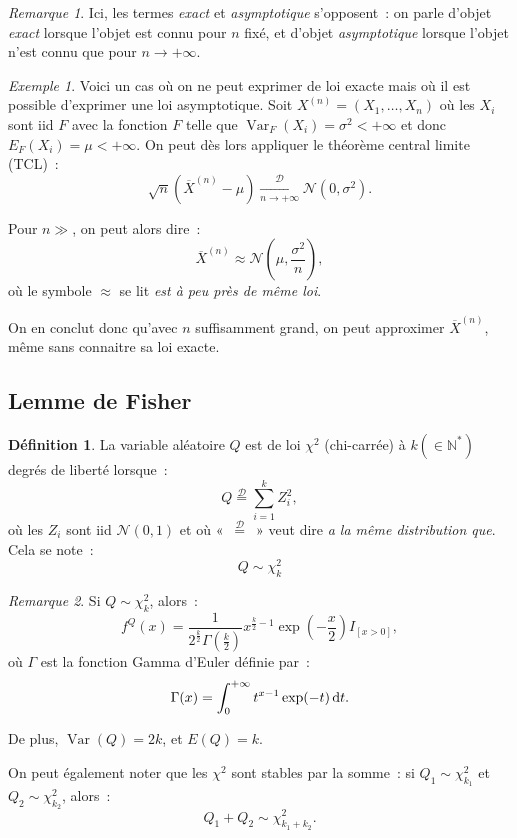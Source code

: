 \documentclass{report}
\DeclareMathOperator{\Var}{Var}
\newcommand{\pinfty}{{+\infty}}
\newcommand{\cvgd}{\xrightarrow[n \to \pinfty]{\mathcal D}}
\newcommand{\distreq}{\overset {\mathcal D}=}
\newcommand{\Nzo}{\mathcal N(0, 1)}
\newcommand{\N}{\mathbb N}
\newcommand{\charfun}[1]{I_{\left[#1\right]}}
\theoremstyle{definition}
\newtheorem{déf}[thm]{Définition}
\theoremstyle{remark}
\newtheorem*{rmq}{Remarque}
\newtheorem{ex}{Exemple}[chapter]
\begin{document}
		\begin{rmq} Ici, les termes \textit{exact} et \textit{asymptotique} s'opposent~: on parle d'objet \textit{exact} lorsque l'objet est connu pour $n$ fixé,
		et d'objet \textit{asymptotique} lorsque l'objet n'est connu que pour $n \to \pinfty$.
		\end{rmq}

		\begin{ex} Voici un cas où on ne peut exprimer de loi exacte mais où il est possible d'exprimer une loi asymptotique. Soit $X^{(n)} = (X_1, \ldots, X_n)$
		où les $X_i$ sont iid $F$ avec la fonction $F$ telle que $\Var_F(X_i) = \sigma^2 < \pinfty$ et donc $E_F(X_i) = \mu < \pinfty$. On peut dès lors
		appliquer le théorème central limite (TCL)~:
		\[\sqrt n(\overline X^{(n)} - \mu) \cvgd \mathcal N(0, \sigma^2).\]

		Pour $n \gg$, on peut alors dire~:
		\[\overline X^{(n)} \approx \mathcal N\left(\mu, \frac {\sigma^2}n\right),\]
		où le symbole $\approx$ se lit \textit{est à peu près de même loi}.

		On en conclut donc qu'avec $n$ suffisamment grand, on peut approximer $\overline X^{(n)}$, même sans connaitre sa loi exacte.
		\end{ex}

	\subsection{Lemme de Fisher}
		\begin{déf} La variable aléatoire $Q$ est de loi $\chi^2$ (chi-carrée) à $k (\in \N^*)$ degrés de liberté lorsque~:
		\[Q \distreq \sum_{i=1}^kZ_i^2,\]
		où les $Z_i$ sont iid $\Nzo$ et où «~$\distreq$~» veut dire \textit{a la même distribution que}. Cela se note~:
		\[Q \sim \chi^2_k\]
		\end{déf}
		\begin{rmq} Si $Q \sim \chi^2_k$, alors~:
		\[f^Q(x) = \frac 1{2^{\frac k2}\Gamma\left(\frac k2\right)}x^{\frac k2-1}\exp\left(-\frac x2\right)\charfun{x > 0},\]
		où $\Gamma$ est la fonction Gamma d'Euler définie par~:
		\[\Gamma(x) = \int_0^\pinfty t^{x-1}\exp(-t)\dif t.\]

		De plus, $\Var(Q) = 2k$, et $E(Q) = k$.

		On peut également noter que les $\chi^2$ sont stables par la somme~: si $Q_1 \sim \chi^2_{k_1}$ et $Q_2 \sim \chi^2_{k_2}$, alors~:
		\[Q_1 + Q_2 \sim \chi^2_{k_1+k_2}.\]
		\end{rmq}
\end{document}

